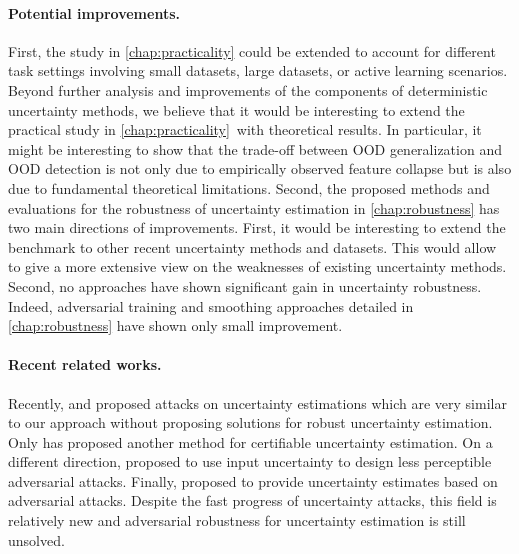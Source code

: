 \paragraph{Potential improvements.} First, the study in \cref{chap:practicality} could be extended to account for different task settings involving small datasets, large datasets, or active learning scenarios. Beyond further analysis and improvements of the components of deterministic uncertainty methods, we believe that it would be interesting to extend the practical study in \cref{chap:practicality} with theoretical results. In particular, it might be interesting to show that the trade-off between OOD generalization and OOD detection is not only due to empirically observed feature collapse but is also due to fundamental theoretical limitations. Second, the proposed methods and evaluations for the robustness of uncertainty estimation in \cref{chap:robustness} has two main directions of improvements. First, it would be interesting to extend the benchmark to other recent uncertainty methods and datasets. This would allow to give a more extensive view on the weaknesses of existing uncertainty methods. Second, no approaches have shown significant gain in uncertainty robustness. Indeed, adversarial training and smoothing approaches detailed in \cref{chap:robustness} have shown only small improvement.

\paragraph{Recent related works.} Recently, \cite{galil2021disrupting} and \cite{huimin2022attackingOOD} proposed attacks on uncertainty estimations which are very similar to our approach without proposing solutions for robust uncertainty estimation. Only \cite{meinke2021provably} has proposed another method for certifiable uncertainty estimation. On a different direction, \cite{dia2021localizeduncertainty} proposed to use input uncertainty to design less perceptible adversarial attacks. Finally, \cite{alarab2021attackucertainty} proposed to provide uncertainty estimates based on adversarial attacks. Despite the fast progress of uncertainty attacks, this field is relatively new and adversarial robustness for uncertainty estimation is still unsolved.